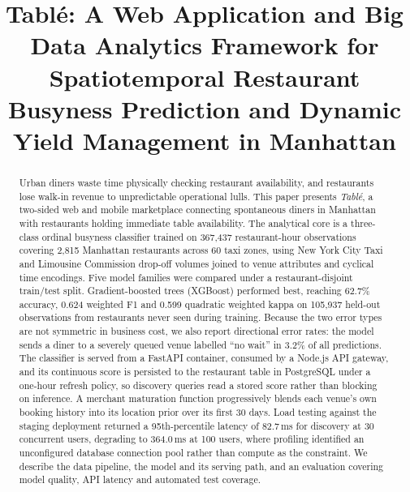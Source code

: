 \documentclass[conference]{IEEEtran}
\begin{document}
\title{Tabl\'{e}: A Web Application and Big Data Analytics Framework for Spatiotemporal Restaurant Busyness Prediction and Dynamic Yield Management in Manhattan}

\author{
}

\maketitle

\begin{abstract}
Urban diners waste time physically checking restaurant availability, and restaurants lose walk-in revenue to unpredictable operational lulls. This paper presents \textit{Tabl\'{e}}, a two-sided web and mobile marketplace connecting spontaneous diners in Manhattan with restaurants holding immediate table availability. The analytical core is a three-class ordinal busyness classifier trained on 367{,}437 restaurant-hour observations covering 2{,}815 Manhattan restaurants across 60 taxi zones, using New York City Taxi and Limousine Commission drop-off volumes joined to venue attributes and cyclical time encodings. Five model families were compared under a restaurant-disjoint train/test split. Gradient-boosted trees (XGBoost) performed best, reaching 62.7\% accuracy, 0.624 weighted F1 and 0.599 quadratic weighted kappa on 105{,}937 held-out observations from restaurants never seen during training. Because the two error types are not symmetric in business cost, we also report directional error rates: the model sends a diner to a severely queued venue labelled ``no wait'' in 3.2\% of all predictions. The classifier is served from a FastAPI container, consumed by a Node.js API gateway, and its continuous score is persisted to the restaurant table in PostgreSQL under a one-hour refresh policy, so discovery queries read a stored score rather than blocking on inference. A merchant maturation function progressively blends each venue's own booking history into its location prior over its first 30 days. Load testing against the staging deployment returned a 95th-percentile latency of 82.7\,ms for discovery at 30 concurrent users, degrading to 364.0\,ms at 100 users, where profiling identified an unconfigured database connection pool rather than compute as the constraint. We describe the data pipeline, the model and its serving path, and an evaluation covering model quality, API latency and automated test coverage.
\end{abstract}
\end{document}
